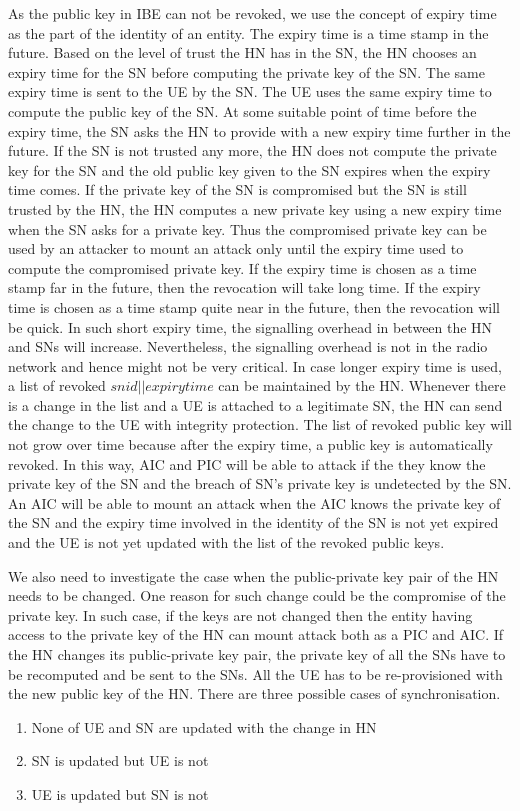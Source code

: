 \documentclass[lnicst,sechang,a4paper]{svmultln}
\begin{document}
As the public key in IBE can not be revoked, we use the concept of expiry time as the part of the identity of an entity. The expiry time is a time stamp in the future. Based on the level of trust the HN has in the SN, the HN chooses an expiry time for the SN before computing the private key of the SN. The same expiry time is sent to the UE by the SN. The UE uses the same expiry time to compute the public key of the SN. At some suitable point of time before the expiry time, the SN asks the HN to provide with a new expiry time further in the future. If the SN is not trusted any more, the HN does not compute the private key for the SN and the old public key given to the SN expires when the expiry time comes. If the private key of the SN is compromised but the SN is still trusted by the HN, the HN computes a new private key using a new expiry time when the SN asks for a private key. Thus the compromised private key can be used by an attacker to mount an attack only until the expiry time used to compute the compromised private key. If the expiry time is chosen as a time stamp far in the future, then the revocation will take long time. If the expiry time is chosen as a time stamp quite near in the future, then the revocation will be quick. In such short expiry time, the signalling overhead in between the HN and SNs will increase. Nevertheless, the signalling overhead is not in the radio network and hence might not be very critical.  In case longer expiry time is used, a list of revoked $snid||expirytime$ can be maintained by the HN. Whenever there is a change in the list and a UE is attached to a legitimate SN, the HN can send the change to the UE with integrity protection. The list of revoked public key will not grow over time because after the expiry time, a public key is automatically revoked. In this way, AIC and PIC will be able to attack if the they know the private key of the SN and the breach of SN's private key is undetected by the SN. An AIC will be able to mount an attack when the AIC knows the private key of the SN and the expiry time involved in the identity of the SN is not yet expired and the UE is not yet updated with the list of the revoked public keys.


We also need to investigate the case when the public-private key pair of the HN needs to be changed. One reason for such change could be the compromise of the private key. In such case, if the keys are not changed then the entity having access to the private key of the HN can mount attack both as a PIC and AIC. If the HN changes its public-private key pair, the private key of all the SNs have to be recomputed and be sent to the SNs. All the UE has to be re-provisioned with the new public key of the HN. There are three possible cases of synchronisation.
\begin{enumerate}
\item None of UE and SN are updated with the change in HN
\item SN is updated but UE is not
\item UE is updated but SN is not
\end{enumerate} 
\end{document}
